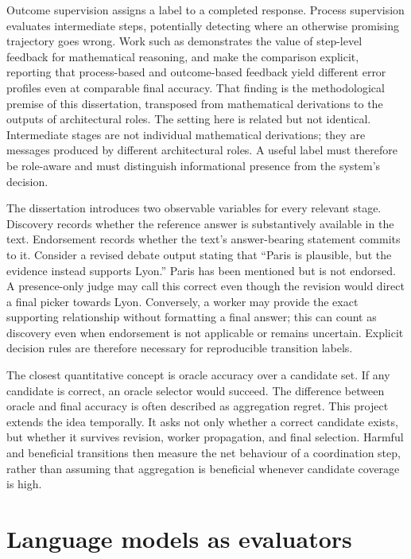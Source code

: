 Outcome supervision assigns a label to a completed response. Process supervision evaluates intermediate steps, potentially detecting where an otherwise promising trajectory goes wrong. Work such as \citet{lightman2023verify} demonstrates the value of step-level feedback for mathematical reasoning, and \citet{uesato2022process} make the comparison explicit, reporting that process-based and outcome-based feedback yield different error profiles even at comparable final accuracy. That finding is the methodological premise of this dissertation, transposed from mathematical derivations to the outputs of architectural roles. The setting here is related but not identical. Intermediate stages are not individual mathematical derivations; they are messages produced by different architectural roles. A useful label must therefore be role-aware and must distinguish informational presence from the system's decision.

The dissertation introduces two observable variables for every relevant stage. Discovery records whether the reference answer is substantively available in the text. Endorsement records whether the text's answer-bearing statement commits to it. Consider a revised debate output stating that ``Paris is plausible, but the evidence instead supports Lyon.'' Paris has been mentioned but is not endorsed. A presence-only judge may call this correct even though the revision would direct a final picker towards Lyon. Conversely, a worker may provide the exact supporting relationship without formatting a final answer; this can count as discovery even when endorsement is not applicable or remains uncertain. Explicit decision rules are therefore necessary for reproducible transition labels.

The closest quantitative concept is oracle accuracy over a candidate set. If any candidate is correct, an oracle selector would succeed. The difference between oracle and final accuracy is often described as aggregation regret. This project extends the idea temporally. It asks not only whether a correct candidate exists, but whether it survives revision, worker propagation, and final selection. Harmful and beneficial transitions then measure the net behaviour of a coordination step, rather than assuming that aggregation is beneficial whenever candidate coverage is high.

\section{Language models as evaluators}

